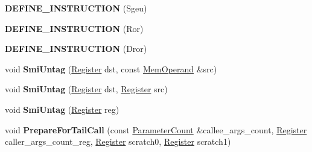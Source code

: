 \begin{DoxyCompactItemize}
\item 
\mbox{\label{classv8_1_1internal_1_1TurboAssembler_a822654b8a3d4876c8af24e8f0ad31679}} 
{\bfseries D\+E\+F\+I\+N\+E\+\_\+\+I\+N\+S\+T\+R\+U\+C\+T\+I\+ON} (Sgeu)
\item 
\mbox{\label{classv8_1_1internal_1_1TurboAssembler_a7a0709670231b3768224f51dc2d6e64b}} 
{\bfseries D\+E\+F\+I\+N\+E\+\_\+\+I\+N\+S\+T\+R\+U\+C\+T\+I\+ON} (Ror)
\item 
\mbox{\label{classv8_1_1internal_1_1TurboAssembler_aeed499871378d6aa4d9c643b5cd57266}} 
{\bfseries D\+E\+F\+I\+N\+E\+\_\+\+I\+N\+S\+T\+R\+U\+C\+T\+I\+ON} (Dror)
\item 
\mbox{\label{classv8_1_1internal_1_1TurboAssembler_aac3d9d6447c1f2d2b7192d91bc082839}} 
void {\bfseries Smi\+Untag} (\mbox{\hyperlink{classv8_1_1internal_1_1Register}{Register}} dst, const \mbox{\hyperlink{classv8_1_1internal_1_1MemOperand}{Mem\+Operand}} \&src)
\item 
\mbox{\label{classv8_1_1internal_1_1TurboAssembler_a662e721293e21b26a146af007a839080}} 
void {\bfseries Smi\+Untag} (\mbox{\hyperlink{classv8_1_1internal_1_1Register}{Register}} dst, \mbox{\hyperlink{classv8_1_1internal_1_1Register}{Register}} src)
\item 
\mbox{\label{classv8_1_1internal_1_1TurboAssembler_a928bb2043ef98e694176a9220ccaeaf8}} 
void {\bfseries Smi\+Untag} (\mbox{\hyperlink{classv8_1_1internal_1_1Register}{Register}} reg)
\item 
\mbox{\label{classv8_1_1internal_1_1TurboAssembler_a39e544d96166c4b553cc204fae211b68}} 
void {\bfseries Prepare\+For\+Tail\+Call} (const \mbox{\hyperlink{classv8_1_1internal_1_1ParameterCount}{Parameter\+Count}} \&callee\+\_\+args\+\_\+count, \mbox{\hyperlink{classv8_1_1internal_1_1Register}{Register}} caller\+\_\+args\+\_\+count\+\_\+reg, \mbox{\hyperlink{classv8_1_1internal_1_1Register}{Register}} scratch0, \mbox{\hyperlink{classv8_1_1internal_1_1Register}{Register}} scratch1)
\item 

\end{DoxyCompactItemize}
